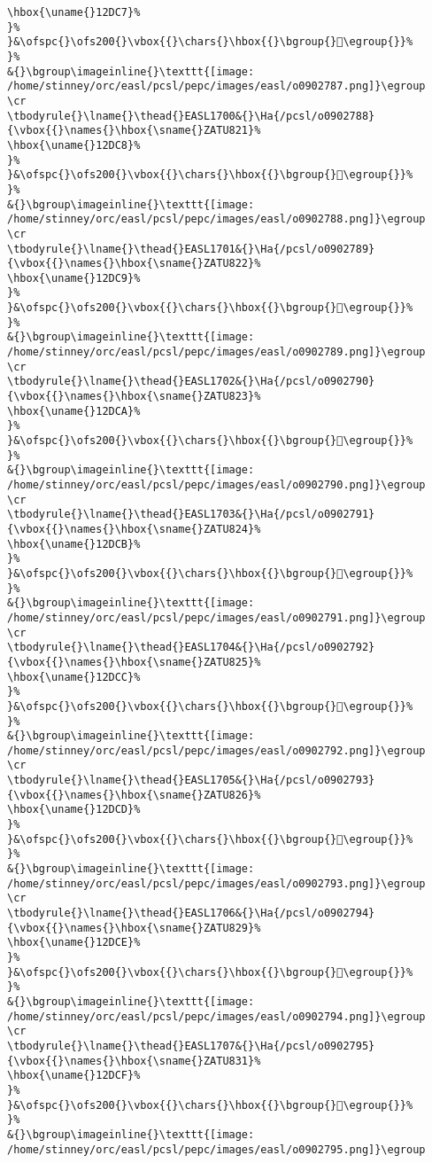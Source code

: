 \begin{verbatim}
\hbox{\uname{}12DC7}%
}%
}&\ofspc{}\ofs200{}\vbox{{}\chars{}\hbox{{}\bgroup{}𒷇\egroup{}}%
}%
&{}\bgroup\imageinline{}\texttt{[image: /home/stinney/orc/easl/pcsl/pepc/images/easl/o0902787.png]}\egroup
\cr
\tbodyrule{}\lname{}\thead{}EASL1700&{}\Ha{/pcsl/o0902788}{\vbox{{}\names{}\hbox{\sname{}ZATU821}%
\hbox{\uname{}12DC8}%
}%
}&\ofspc{}\ofs200{}\vbox{{}\chars{}\hbox{{}\bgroup{}𒷈\egroup{}}%
}%
&{}\bgroup\imageinline{}\texttt{[image: /home/stinney/orc/easl/pcsl/pepc/images/easl/o0902788.png]}\egroup
\cr
\tbodyrule{}\lname{}\thead{}EASL1701&{}\Ha{/pcsl/o0902789}{\vbox{{}\names{}\hbox{\sname{}ZATU822}%
\hbox{\uname{}12DC9}%
}%
}&\ofspc{}\ofs200{}\vbox{{}\chars{}\hbox{{}\bgroup{}𒷉\egroup{}}%
}%
&{}\bgroup\imageinline{}\texttt{[image: /home/stinney/orc/easl/pcsl/pepc/images/easl/o0902789.png]}\egroup
\cr
\tbodyrule{}\lname{}\thead{}EASL1702&{}\Ha{/pcsl/o0902790}{\vbox{{}\names{}\hbox{\sname{}ZATU823}%
\hbox{\uname{}12DCA}%
}%
}&\ofspc{}\ofs200{}\vbox{{}\chars{}\hbox{{}\bgroup{}𒷊\egroup{}}%
}%
&{}\bgroup\imageinline{}\texttt{[image: /home/stinney/orc/easl/pcsl/pepc/images/easl/o0902790.png]}\egroup
\cr
\tbodyrule{}\lname{}\thead{}EASL1703&{}\Ha{/pcsl/o0902791}{\vbox{{}\names{}\hbox{\sname{}ZATU824}%
\hbox{\uname{}12DCB}%
}%
}&\ofspc{}\ofs200{}\vbox{{}\chars{}\hbox{{}\bgroup{}𒷋\egroup{}}%
}%
&{}\bgroup\imageinline{}\texttt{[image: /home/stinney/orc/easl/pcsl/pepc/images/easl/o0902791.png]}\egroup
\cr
\tbodyrule{}\lname{}\thead{}EASL1704&{}\Ha{/pcsl/o0902792}{\vbox{{}\names{}\hbox{\sname{}ZATU825}%
\hbox{\uname{}12DCC}%
}%
}&\ofspc{}\ofs200{}\vbox{{}\chars{}\hbox{{}\bgroup{}𒷌\egroup{}}%
}%
&{}\bgroup\imageinline{}\texttt{[image: /home/stinney/orc/easl/pcsl/pepc/images/easl/o0902792.png]}\egroup
\cr
\tbodyrule{}\lname{}\thead{}EASL1705&{}\Ha{/pcsl/o0902793}{\vbox{{}\names{}\hbox{\sname{}ZATU826}%
\hbox{\uname{}12DCD}%
}%
}&\ofspc{}\ofs200{}\vbox{{}\chars{}\hbox{{}\bgroup{}𒷍\egroup{}}%
}%
&{}\bgroup\imageinline{}\texttt{[image: /home/stinney/orc/easl/pcsl/pepc/images/easl/o0902793.png]}\egroup
\cr
\tbodyrule{}\lname{}\thead{}EASL1706&{}\Ha{/pcsl/o0902794}{\vbox{{}\names{}\hbox{\sname{}ZATU829}%
\hbox{\uname{}12DCE}%
}%
}&\ofspc{}\ofs200{}\vbox{{}\chars{}\hbox{{}\bgroup{}𒷎\egroup{}}%
}%
&{}\bgroup\imageinline{}\texttt{[image: /home/stinney/orc/easl/pcsl/pepc/images/easl/o0902794.png]}\egroup
\cr
\tbodyrule{}\lname{}\thead{}EASL1707&{}\Ha{/pcsl/o0902795}{\vbox{{}\names{}\hbox{\sname{}ZATU831}%
\hbox{\uname{}12DCF}%
}%
}&\ofspc{}\ofs200{}\vbox{{}\chars{}\hbox{{}\bgroup{}𒷏\egroup{}}%
}%
&{}\bgroup\imageinline{}\texttt{[image: /home/stinney/orc/easl/pcsl/pepc/images/easl/o0902795.png]}\egroup

\end{verbatim}

